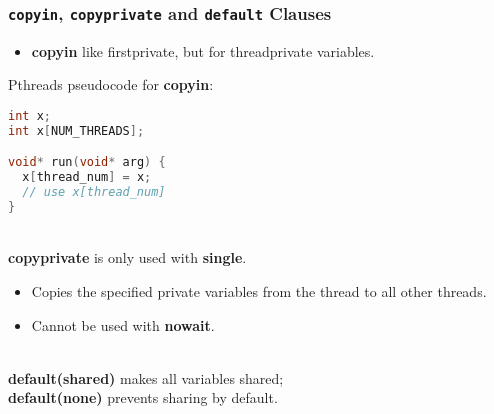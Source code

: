\documentclass[aspectratio=43]{beamer}
\newenvironment{changemargin}[1]{%
  \begin{list}{}{%
    \setlength{\topsep}{0pt}%
    \setlength{\leftmargin}{#1}%
    \setlength{\rightmargin}{1em}
    \setlength{\listparindent}{\parindent}%
    \setlength{\itemindent}{\parindent}%
    \setlength{\parsep}{\parskip}%
  }%
  \item[]}{\end{list}}
\begin{document}
\begin{frame}[fragile]
  \frametitle{{\tt copyin}, {\tt copyprivate} and {\tt default} Clauses}

  \begin{changemargin}{2cm}
  \begin{itemize}
    \item {\bf copyin} like firstprivate, but for threadprivate variables.
  \end{itemize}

  Pthreads pseudocode for {\bf copyin}:
  \begin{lstlisting}[language=C]
int x;
int x[NUM_THREADS];

void* run(void* arg) {
  x[thread_num] = x;
  // use x[thread_num]
}
  \end{lstlisting}
~\\
    {\bf copyprivate} is only used with {\bf single}.
      \begin{itemize}
        \item Copies the specified private variables from the thread to all other
          threads.
        \item Cannot be used with {\bf nowait}.
      \end{itemize}
  ~\\

    {\bf default(shared)} makes all variables shared; \\{\bf default(none)} prevents sharing by default.
  \end{changemargin}

\end{frame}
\end{document}
